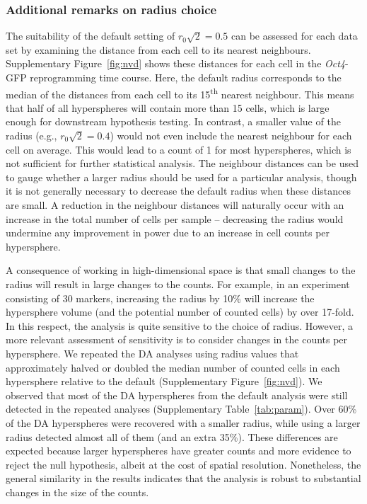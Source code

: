 \documentclass{article}
\begin{document}
\subsubsection{Additional remarks on radius choice}
\label{sec:additionalradius}

The suitability of the default setting of $r_0\sqrt{2}=0.5$ can be assessed for each data set by examining the distance from each cell to its nearest neighbours.
Supplementary Figure~\ref{fig:nvd} shows these distances for each cell in the \textit{Oct4}-GFP reprogramming time course.
Here, the default radius corresponds to the median of the distances from each cell to its 15\textsuperscript{th} nearest neighbour.
This means that half of all hyperspheres will contain more than 15 cells, which is large enough for downstream hypothesis testing.
In contrast, a smaller value of the radius (e.g., $r_0\sqrt{2}=0.4$) would not even include the nearest neighbour for each cell on average.
This would lead to a count of 1 for most hyperspheres, which is not sufficient for further statistical analysis.
The neighbour distances can be used to gauge whether a larger radius should be used for a particular analysis, though it is not generally necessary to decrease the default radius when these distances are small.
A reduction in the neighbour distances will naturally occur with an increase in the total number of cells per sample -- decreasing the radius would undermine any improvement in power due to an increase in cell counts per hypersphere.


A consequence of working in high-dimensional space is that small changes to the radius will result in large changes to the counts.
For example, in an experiment consisting of 30 markers, increasing the radius by 10\% will increase the hypersphere volume (and the potential number of counted cells) by over 17-fold. 
In this respect, the analysis is quite sensitive to the choice of radius.
However, a more relevant assessment of sensitivity is to consider changes in the counts per hypersphere.
We repeated the DA analyses using radius values that approximately halved or doubled the median number of counted cells in each hypersphere relative to the default (Supplementary Figure~\ref{fig:nvd}).
We observed that most of the DA hyperspheres from the default analysis were still detected in the repeated analyses (Supplementary Table~\ref{tab:param}).
Over 60\% of the DA hyperspheres were recovered with a smaller radius, while using a larger radius detected almost all of them (and an extra 35\%).
These differences are expected because larger hyperspheres have greater counts and more evidence to reject the null hypothesis, albeit at the cost of spatial resolution.
Nonetheless, the general similarity in the results indicates that the analysis is robust to substantial changes in the size of the counts.
\end{document}
